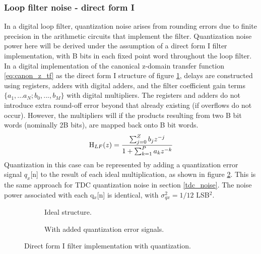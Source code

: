 \subsubsection{Loop filter noise - direct form I}\label{lf_noise}
	In a digital loop filter, quantization noise arises from rounding errors due to finite precision in the arithmetic circuits that implement the filter. Quantization noise power here will be derived under the assumption of a direct form I filter implementation, with B bits in each fixed point word throughout the loop filter. In a digital implementation of the canonical z-domain transfer function \ref{eq:canon_z_tf} as the direct form I structure of figure \ref{fig:direct_type_1_ideal}, delays are constructed using registers, adders with digital adders, and the filter coefficient gain terms $\{a_1, ... a_N; b_0, ..., b_M\}$ with digital multipliers. The registers and adders do not introduce extra round-off error beyond that already existing (if overflows do not occur). However, the multipliers will if the products resulting from two B bit words (nominally 2B bits), are mapped back onto B bit words.
	\begin{equation}
		\textnormal{H}_{LF}(z) = \frac{\sum_{j=0}^Z b_jz^{-j}}{1+\sum_{k=1}^P a_kz^{-k}}\label{eq:canon_z_tf}
	\end{equation}
	\FloatBarrier
	Quantization in this case can be represented by adding a quantization error signal $q_x$[n] to the result of each ideal multiplication, as shown in figure \ref{fig:direct_type_1_quant}. This is the same approach for TDC quantization noise in section \ref{tdc_noise}. The noise power associated with each q$_x$[n] is identical, with $\sigma_{qx}^2 = 1/12$ LSB$^2$. 

	\begin{figure}[htb!]
	    \centering
	    \begin{subfigure}{0.5\textwidth}
	        \centering
	        
	        \vspace{1.2em}
	        \caption{Ideal structure.}
	        \label{fig:direct_type_1_ideal}
	    \end{subfigure}%
	    \begin{subfigure}{0.5\textwidth}
	        \centering
	        
	        \caption{With added quantization error signals.}
	        \label{fig:direct_type_1_quant}
	    \end{subfigure}
	    \label{fig:direct_type_1}
	    \caption{Direct form I filter implementation with quantization.}
	\end{figure}

